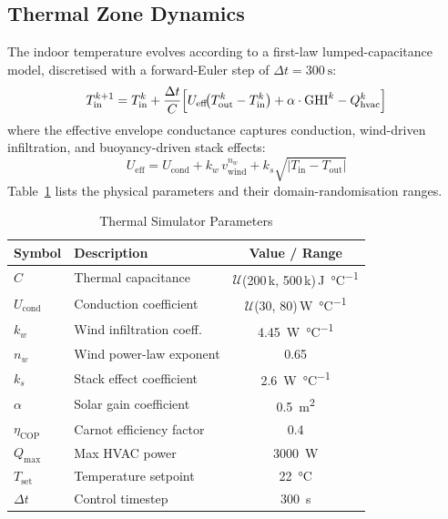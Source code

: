 \documentclass[conference]{IEEEtran}
\begin{document}
\subsection{Thermal Zone Dynamics}
\label{subsec:thermal-dynamics}
The indoor temperature evolves according to a first-law lumped-capacitance
model, discretised with a forward-Euler step of
$\Delta t = \SI{300}{\second}$:
%
\begin{equation}
  \label{eq:thermal-ode}
  T_{\text{in}}^{k+1} = T_{\text{in}}^{k}
    + \frac{\Delta t}{C}\Bigl[
        U_{\text{eff}}\!\bigl(T_{\text{out}}^{k} - T_{\text{in}}^{k}\bigr)
        + \alpha \cdot \text{GHI}^{k}
        - Q_{\text{hvac}}^{k}
      \Bigr]
\end{equation}
%
where the effective envelope conductance captures conduction, wind-driven
infiltration, and buoyancy-driven stack effects:
%
\begin{equation}
  \label{eq:ueff}
  U_{\text{eff}} = U_{\text{cond}}
    + k_w \, v_{\text{wind}}^{n_w}
    + k_s \sqrt{|T_{\text{in}} - T_{\text{out}}|}
\end{equation}
%
Table~\ref{tab:params} lists the physical parameters and their
domain-randomisation ranges.

\begin{table}[htb]
  \centering
  \caption{Thermal Simulator Parameters}
  \label{tab:params}
  \begin{tabular}{llc}
    \toprule
    \textbf{Symbol} & \textbf{Description} & \textbf{Value / Range} \\
    \midrule
    $C$                  & Thermal capacitance       & $\mathcal{U}$(200\,k, 500\,k)\,\si{\joule\per\degreeCelsius} \\
    $U_{\text{cond}}$    & Conduction coefficient    & $\mathcal{U}$(30, 80)\,\si{\watt\per\degreeCelsius} \\
    $k_w$                & Wind infiltration coeff.  & \SI{4.45}{\watt\per\degreeCelsius} \\
    $n_w$                & Wind power-law exponent   & 0.65 \\
    $k_s$                & Stack effect coefficient  & \SI{2.6}{\watt\per\degreeCelsius} \\
    $\alpha$             & Solar gain coefficient    & \SI{0.5}{\metre\squared} \\
    $\eta_{\text{COP}}$  & Carnot efficiency factor  & 0.4 \\
    $Q_{\max}$           & Max HVAC power            & \SI{3000}{\watt} \\
    $T_{\text{set}}$     & Temperature setpoint      & \SI{22}{\degreeCelsius} \\
    $\Delta t$           & Control timestep          & \SI{300}{\second} \\
    \bottomrule
  \end{tabular}
\end{table}
\end{document}
